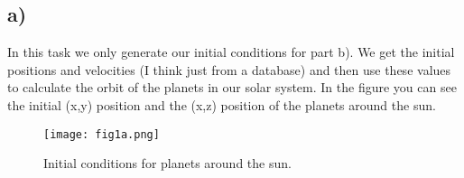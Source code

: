 \subsection{a)}
In this task we only generate our initial conditions for part b). We get the initial positions and velocities (I think just from a database) and then use these values to calculate the orbit of the planets in our solar system.
In the figure you can see the initial (x,y) position and the (x,z) position of the planets around the sun. 

\begin{figure}[h!]
    \centering
    \texttt{[image: fig1a.png]}
    \caption{Initial conditions for planets around the sun.}
\end{figure}



